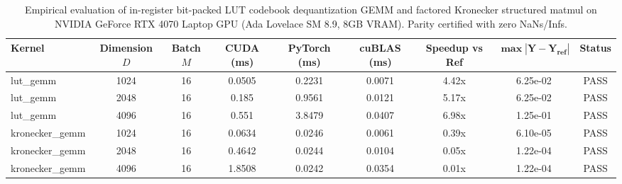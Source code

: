 \documentclass[journal]{IEEEtran}
\begin{document}
\begin{table}[t]
\centering
\small
\begin{tabular}{lcccccccc}
\toprule
\textbf{Kernel} & \textbf{Dimension $D$} & \textbf{Batch $M$} & \textbf{CUDA (ms)} & \textbf{PyTorch (ms)} & \textbf{cuBLAS (ms)} & \textbf{Speedup vs Ref} & $\mathbf{\max |\mathbf{Y} - \mathbf{Y}_{\text{ref}}|}$ & \textbf{Status} \\
\midrule
lut_gemm & 1024 & 16 & 0.0505 & 0.2231 & 0.0071 & 4.42x & 6.25e-02 & PASS \\
lut_gemm & 2048 & 16 & 0.185 & 0.9561 & 0.0121 & 5.17x & 6.25e-02 & PASS \\
lut_gemm & 4096 & 16 & 0.551 & 3.8479 & 0.0407 & 6.98x & 1.25e-01 & PASS \\
kronecker_gemm & 1024 & 16 & 0.0634 & 0.0246 & 0.0061 & 0.39x & 6.10e-05 & PASS \\
kronecker_gemm & 2048 & 16 & 0.4642 & 0.0244 & 0.0104 & 0.05x & 1.22e-04 & PASS \\
kronecker_gemm & 4096 & 16 & 1.8508 & 0.0242 & 0.0354 & 0.01x & 1.22e-04 & PASS \\
\bottomrule
\end{tabular}
\caption{Empirical evaluation of in-register bit-packed LUT codebook dequantization GEMM and factored Kronecker structured matmul on NVIDIA GeForce RTX 4070 Laptop GPU (Ada Lovelace SM 8.9, 8GB VRAM). Parity certified with zero NaNs/Infs.}
\label{tab:lut_kronecker_gemm}
\end{table}
\end{document}
